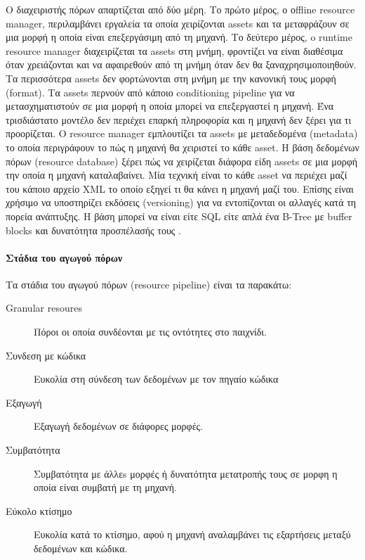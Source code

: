 Ο διαχειριστής πόρων απαρτίζεται από δύο μέρη. Το πρώτο μέρος, ο οffline resource manager, περιλαμβάνει εργαλεία τα οποία χειρίζονται assets και τα μεταφράζουν σε μια μορφή η οποία είναι επεξεργάσιμη από τη μηχανή. Το δεύτερο μέρος, o runtime resource manager διαχειρίζεται τα assets στη μνήμη, φροντίζει να είναι διαθέσιμα όταν χρειάζονται και να αφαιρεθούν από τη μνήμη όταν δεν θα ξαναχρησιμοποιηθούν.
Τα περισσότερα assets δεν φορτώνονται στη μνήμη με την κανονική τους μορφή (format). Τα assets περνούν από κάποιο conditioning pipeline για να μετασχηματιστούν σε μια μορφή η οποία μπορεί να επεξεργαστεί η μηχανή. Ένα τρισδιάστατο μοντέλο δεν περιέχει επαρκή πληροφορία και η μηχανή δεν ξέρει για τι προορίζεται. Ο resource manager εμπλουτίζει τα assets με μεταδεδομένα (metadata) το οποία περιγράφουν το πώς η μηχανή θα χειριστεί το κάθε asset.
H βάση δεδομένων πόρων (resource database) ξέρει πώς να χειρίζεται διάφορα είδη assets σε μια μορφή την οποία η μηχανή καταλαβαίνει. Μία  τεχνική είναι το κάθε asset να περιέχει μαζί του κάποιο αρχείο \gls{XML} το οποίο εξηγεί τι θα κάνει η μηχανή μαζί του. Επίσης είναι χρήσιμο να υποστηρίζει  εκδόσεις (versioning) για να εντοπίζονται οι αλλαγές κατά τη πορεία ανάπτυξης. Η βάση μπορεί να είναι είτε SQL είτε απλά ένα \gls{B-Tree} με buffer blocks και δυνατότητα προσπέλασής τους \cite{Sousa:2002:GPO:580160}.

\paragraph{Στάδια του αγωγού πόρων}
Τα στάδια του αγωγού πόρων (resource pipeline) είναι τα παρακάτω:
\begin{description}
\item [Granular resoures] Πόροι οι οποία συνδέονται με τις οντότητες στο παιχνίδι. 
\item [Συνδεση με κώδικα] Ευκολία στη σύνδεση των δεδομένων με τον πηγαίο κώδικα
\item [Εξαγωγή] Εξαγωγή δεδομένων σε διάφορες μορφές.
\item [Συμβατότητα] Συμβατότητα με άλλεs μορφές ή δυνατότητα μετατροπής τους σε μορφη η οποία είναι συμβατή με τη μηχανή.
\item [Εύκολο κτίσημο] Ευκολία κατά το κτίσημο, αφού η μηχανή αναλαμβάνει τις εξαρτήσεις μεταξύ δεδομένων και κώδικα.
\end{description}

